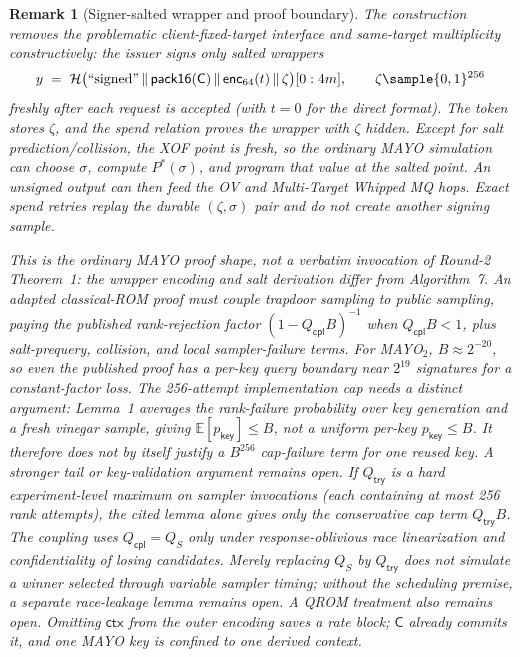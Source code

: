 \documentclass[11pt]{article}
\newtheorem{remark}{Remark}
\newcommand{\ctx}{\mathsf{ctx}}
\newcommand{\enc}{\mathsf{enc}_{64}}
\newcommand{\Cred}{\mathsf{C}}
\begin{document}
\begin{remark}[Signer-salted wrapper and proof boundary]
\label{rem:salted}
The construction removes the problematic client-fixed-target interface and
same-target multiplicity constructively: the issuer signs only salted wrappers
\[
y \;=\; \mathcal{H}\bigl(\text{``signed''} \,\|\,
\mathsf{pack16}(\Cred) \,\|\, \enc(t) \,\|\, \zeta\bigr)[0:4m],
\qquad \zeta \sample \{0,1\}^{256}
\]
freshly after each request is accepted (with $t=0$ for the direct format).
The token stores $\zeta$, and the spend relation proves the wrapper with
$\zeta$ hidden.  Except for salt prediction/collision, the XOF point is fresh,
so the ordinary MAYO simulation can choose $\sigma$, compute
$P^\ast(\sigma)$, and program that value at the salted point.  An unsigned
output can then feed the OV and Multi-Target Whipped MQ hops.  Exact spend
retries replay the durable $(\zeta,\sigma)$ pair and do not create another
signing sample.

This is the ordinary MAYO \emph{proof shape}, not a verbatim invocation of
Round-2 Theorem~1: the wrapper encoding and salt derivation differ from
Algorithm~7.  An adapted classical-ROM proof must couple trapdoor sampling
to public sampling, paying the published rank-rejection factor
$(1-Q_{\mathsf{cpl}} B)^{-1}$ when $Q_{\mathsf{cpl}} B<1$, plus salt-prequery, collision, and local
sampler-failure terms.  For MAYO$_2$, $B\approx2^{-20}$, so even the
published proof has a per-key query boundary near $2^{19}$ signatures for a
constant-factor loss.  The 256-attempt implementation cap needs a distinct
argument: Lemma~1 averages the rank-failure probability over key generation
and a fresh vinegar sample, giving $\mathbb{E}[p_{\mathsf{key}}]\le B$, not a
uniform per-key $p_{\mathsf{key}}\le B$.  It therefore does not by itself
justify a $B^{256}$ cap-failure term for one reused key.  A stronger tail or
key-validation argument remains open. If $Q_{\mathsf{try}}$ is a hard
experiment-level maximum on sampler invocations (each containing at most 256
rank attempts), the cited lemma alone gives only the conservative cap term
$Q_{\mathsf{try}}B$. The coupling uses $Q_{\mathsf{cpl}}=Q_S$ only under
response-oblivious race linearization and confidentiality of losing
candidates. Merely replacing $Q_S$ by $Q_{\mathsf{try}}$ does not simulate a
winner selected through variable sampler timing; without the scheduling
premise, a separate race-leakage lemma remains open. A QROM treatment also
remains open. Omitting $\ctx$
from the outer encoding saves a rate block; $\Cred$ already commits it, and
one MAYO key is confined to one derived context.
\end{remark}
\end{document}
